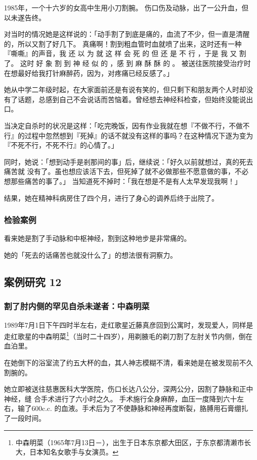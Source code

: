 \documentclass[UTF8]{ctexart}
\begin{document}
1985年，一个十六岁的女高中生用小刀割腕。
伤口伤及动脉，出了一公升血，但以未遂告终。

对当时的情况她是这样说的：「动手割了到底是痛的，血流了不少，但一直是清醒的，所以又割了好几下。
真痛啊！割到粗血管时血就喷了出来，这时还有一种『嘶嘶』的声音，我 还 以 为 就 这 样 会 死 的 但 还 是 不 行 ，于是 我 又 割 了。
这时 好 象 割 到 神 经 似 的 ，感 到 麻 酥 酥 的 。 
被送往医院接受治疗时在想最好给我打针麻醉药，因为，对疼痛已经反感了。」

她从中学二年级时起，在大家面前还是有说有笑的，但只剩下和朋友两个人时却没有了话题，总感到自己不会说话而苦恼着。曾经想去神经科检查，但始终没能说出口。

当决定自杀时的状况是这样：「吃完晚饭，因有作业我就在想『不做不行，不做不行』的过程中忽然想到『死掉』的话不就没有这样的事吗？在这种情况下逐为变为『不死不行，不死不行』的心情了。」

同时，她说：「想到动手是剎那间的事」后，继续说：「好久以前就想过，真的死去痛苦就 没有了。虽也想应该活下去，但死掉了就不必做那些不愿意做的事，不必想那些痛苦的事了。」 当知道死不掉时：「我在想是不是有人太早发现我啊！」

结果，她在精神科病房住了四个月，进行了身心的调养后终于出院了。

\subsubsection*{检验案例}

看来她是割了手动脉和中枢神经，割到这种地步是非常痛的。

她的「死去的话痛苦也就没什么了」的想法很有洞察力。

\subsection{案例研究 12}
\subsubsection*{割了肘内侧的罕见自杀未遂者：中森明菜}

1989年7月1日下午四时半左右，走红歌星近藤真彦回到公寓时，发现爱人，同样是走红歌星的中森明菜\footnote{中森明菜（1965年7月13日－\qquad \qquad ），出生于日本东京都大田区，于东京都清濑市长大，日本知名女歌手与女演员。}（当时二十四岁），用剃腋毛的剃刀割了左肘关节内侧，倒在血泊里。

在她倒下的浴室流了约五大杯的血，其人神志模糊不清，看来她是在被发现前不久割腕的。

她立即被送往慈惠医科大学医院，伤口长达八公分，深两公分，因割了静脉和正中神经，缝 合手术进行了六小时之久。
手术施行全身麻醉，血压一度降到六十左右，输了$600$c.c. 的血液。手术后为了不使静脉和神经再度断裂，胳膊用石膏绷扎了一段时间。 
\end{document}
